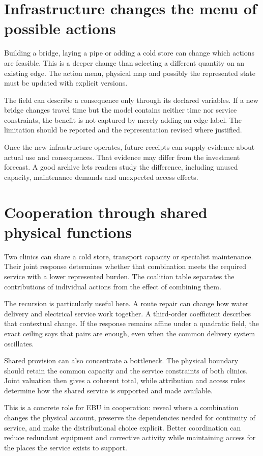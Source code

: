 \section{Infrastructure changes the menu of possible actions}
Building a bridge, laying a pipe or adding a cold store can change which actions are feasible. This is a deeper change than selecting a different quantity on an existing edge. The action menu, physical map and possibly the represented state must be updated with explicit versions.

The field can describe a consequence only through its declared variables. If a new bridge changes travel time but the model contains neither time nor service constraints, the benefit is not captured by merely adding an edge label. The limitation should be reported and the representation revised where justified.

Once the new infrastructure operates, future receipts can supply evidence about actual use and consequences. That evidence may differ from the investment forecast. A good archive lets readers study the difference, including unused capacity, maintenance demands and unexpected access effects.

\section{Cooperation through shared physical functions}
Two clinics can share a cold store, transport capacity or specialist maintenance. Their joint response determines whether that combination meets the required service with a lower represented burden. The coalition table separates the contributions of individual actions from the effect of combining them.

The recursion is particularly useful here. A route repair can change how water delivery and electrical service work together. A third-order coefficient describes that contextual change. If the response remains affine under a quadratic field, the exact ceiling says that pairs are enough, even when the common delivery system oscillates.

Shared provision can also concentrate a bottleneck. The physical boundary should retain the common capacity and the service constraints of both clinics. Joint valuation then gives a coherent total, while attribution and access rules determine how the shared service is supported and made available.

This is a concrete role for EBU in cooperation: reveal where a combination changes the physical account, preserve the dependencies needed for continuity of service, and make the distributional choice explicit. Better coordination can reduce redundant equipment and corrective activity while maintaining access for the places the service exists to support.


